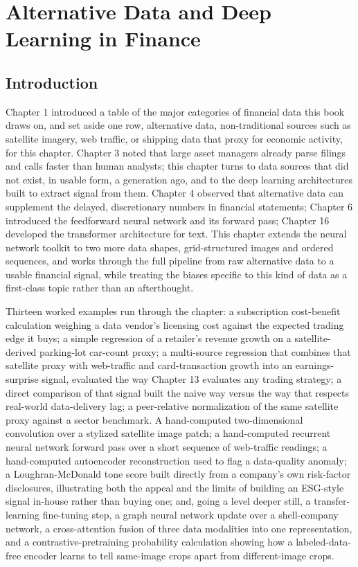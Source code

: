 \documentclass[../ai_in_finance]{subfiles}
\begin{document}
\chapter{Alternative Data and Deep Learning in Finance}

\section{Introduction}

Chapter 1 introduced a table of the major categories of financial data this book draws on, and set aside one row, alternative data, non-traditional sources such as satellite imagery, web traffic, or shipping data that proxy for economic activity, for this chapter. Chapter 3 noted that large asset managers already parse filings and calls faster than human analysts; this chapter turns to data sources that did not exist, in usable form, a generation ago, and to the deep learning architectures built to extract signal from them. Chapter 4 observed that alternative data can supplement the delayed, discretionary numbers in financial statements; Chapter 6 introduced the feedforward neural network and its forward pass; Chapter 16 developed the transformer architecture for text. This chapter extends the neural network toolkit to two more data shapes, grid-structured images and ordered sequences, and works through the full pipeline from raw alternative data to a usable financial signal, while treating the biases specific to this kind of data as a first-class topic rather than an afterthought.

Thirteen worked examples run through the chapter: a subscription cost-benefit calculation weighing a data vendor's licensing cost against the expected trading edge it buys; a simple regression of a retailer's revenue growth on a satellite-derived parking-lot car-count proxy; a multi-source regression that combines that satellite proxy with web-traffic and card-transaction growth into an earnings-surprise signal, evaluated the way Chapter 13 evaluates any trading strategy; a direct comparison of that signal built the naive way versus the way that respects real-world data-delivery lag; a peer-relative normalization of the same satellite proxy against a sector benchmark. A hand-computed two-dimensional convolution over a stylized satellite image patch; a hand-computed recurrent neural network forward pass over a short sequence of web-traffic readings; a hand-computed autoencoder reconstruction used to flag a data-quality anomaly; a Loughran-McDonald tone score built directly from a company's own risk-factor disclosures, illustrating both the appeal and the limits of building an ESG-style signal in-house rather than buying one; and, going a level deeper still, a transfer-learning fine-tuning step, a graph neural network update over a shell-company network, a cross-attention fusion of three data modalities into one representation, and a contrastive-pretraining probability calculation showing how a labeled-data-free encoder learns to tell same-image crops apart from different-image crops.
\end{document}
